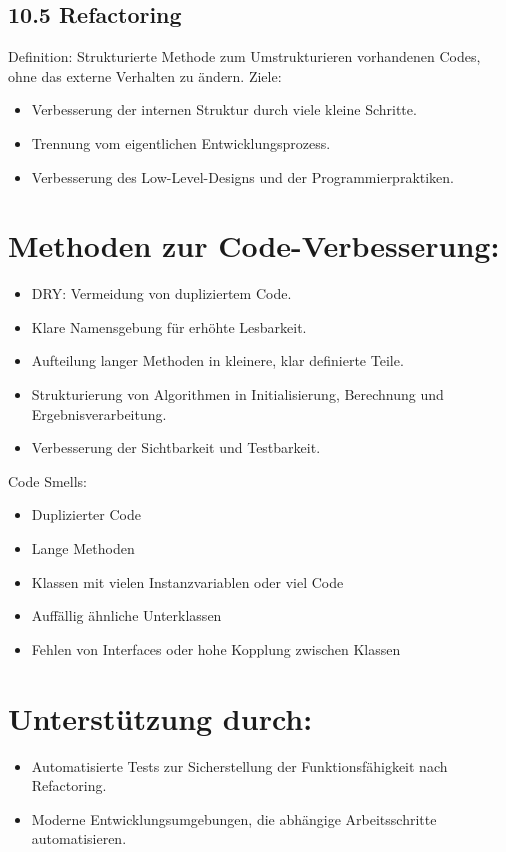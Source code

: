 \subsection*{10.5 Refactoring}
Definition: Strukturierte Methode zum Umstrukturieren vorhandenen Codes, ohne das externe Verhalten zu ändern. Ziele:

\begin{itemize}
  \item Verbesserung der internen Struktur durch viele kleine Schritte.
  \item Trennung vom eigentlichen Entwicklungsprozess.
  \item Verbesserung des Low-Level-Designs und der Programmierpraktiken.
\end{itemize}

\section*{Methoden zur Code-Verbesserung:}
\begin{itemize}
  \item DRY: Vermeidung von dupliziertem Code.
  \item Klare Namensgebung für erhöhte Lesbarkeit.
  \item Aufteilung langer Methoden in kleinere, klar definierte Teile.
  \item Strukturierung von Algorithmen in Initialisierung, Berechnung und Ergebnisverarbeitung.
  \item Verbesserung der Sichtbarkeit und Testbarkeit.
\end{itemize}

Code Smells:

\begin{itemize}
  \item Duplizierter Code
  \item Lange Methoden
  \item Klassen mit vielen Instanzvariablen oder viel Code
  \item Auffällig ähnliche Unterklassen
  \item Fehlen von Interfaces oder hohe Kopplung zwischen Klassen
\end{itemize}

\section*{Unterstützung durch:}
\begin{itemize}
  \item Automatisierte Tests zur Sicherstellung der Funktionsfähigkeit nach Refactoring.
  \item Moderne Entwicklungsumgebungen, die abhängige Arbeitsschritte automatisieren.
\end{itemize}

